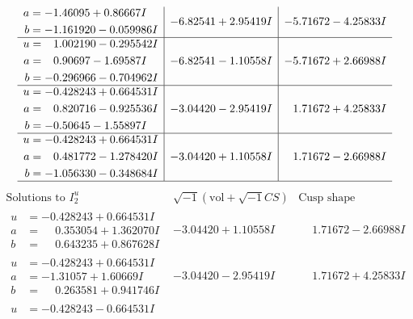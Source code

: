 \documentclass[1p]{elsarticle_modified}
\theoremstyle{definition}
\newcommand{\I}{\sqrt{-1}}
\begin{document}
$$\begin{array}{c|c|c}
\begin{aligned}
a &= -1.46095 + 0.86667 I \\
b &= -1.161920 - 0.059986 I\end{aligned}
 & -6.82541 + 2.95419 I & -5.71672 - 4.25833 I \\ \hline\begin{aligned}
u &= \phantom{-}1.002190 - 0.295542 I \\
a &= \phantom{-}0.90697 - 1.69587 I \\
b &= -0.296966 - 0.704962 I\end{aligned}
 & -6.82541 - 1.10558 I & -5.71672 + 2.66988 I \\ \hline\begin{aligned}
u &= -0.428243 + 0.664531 I \\
a &= \phantom{-}0.820716 - 0.925536 I \\
b &= -0.50645 - 1.55897 I\end{aligned}
 & -3.04420 - 2.95419 I & \phantom{-}1.71672 + 4.25833 I \\ \hline\begin{aligned}
u &= -0.428243 + 0.664531 I \\
a &= \phantom{-}0.481772 - 1.278420 I \\
b &= -1.056330 - 0.348684 I\end{aligned}
 & -3.04420 + 1.10558 I & \phantom{-}1.71672 - 2.66988 I\\
 \hline 
 \end{array}$$\newpage$$\begin{array}{c|c|c}  
\text{Solutions to }I^u_{2}& \I (\text{vol} + \sqrt{-1}CS) & \text{Cusp shape}\\
 \hline 
\begin{aligned}
u &= -0.428243 + 0.664531 I \\
a &= \phantom{-}0.353054 + 1.362070 I \\
b &= \phantom{-}0.643235 + 0.867628 I\end{aligned}
 & -3.04420 + 1.10558 I & \phantom{-}1.71672 - 2.66988 I \\ \hline\begin{aligned}
u &= -0.428243 + 0.664531 I \\
a &= -1.31057 + 1.60669 I \\
b &= \phantom{-}0.263581 + 0.941746 I\end{aligned}
 & -3.04420 - 2.95419 I & \phantom{-}1.71672 + 4.25833 I \\ \hline\begin{aligned}
u &= -0.428243 - 0.664531 I \\

\end{aligned}
\end{array}$$
\end{document}
